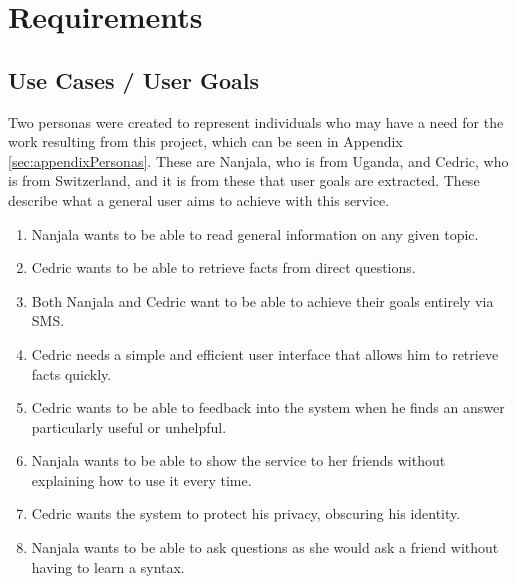 \documentclass[authoryearcitations]{UoYCSproject}
\begin{document}
\section{Requirements}
\label{sec:requirements}
\subsection{Use Cases / User Goals}
Two personas were created to represent individuals who may have a need for the work resulting from this project, which can be seen in Appendix \ref{sec:appendixPersonas}. These are Nanjala, who is from Uganda, and Cedric, who is from Switzerland, and it is from these that user goals are extracted. These describe what a general user aims to achieve with this service.
\begin{enumerate}
  \item Nanjala wants to be able to read general information on any given topic.
  \item Cedric wants to be able to retrieve facts from direct questions.
  \item Both Nanjala and Cedric want to be able to achieve their goals entirely via SMS.
  \item Cedric needs a simple and efficient user interface that allows him to retrieve facts quickly. 
  \item Cedric wants to be able to feedback into the system when he finds an answer particularly useful or unhelpful. 
  \item Nanjala wants to be able to show the service to her friends without explaining how to use it every time.
  \item Cedric wants the system to protect his privacy, obscuring his identity.
  \item Nanjala wants to be able to ask questions as she would ask a friend without having to learn a syntax.
\end{enumerate}
\end{document}
